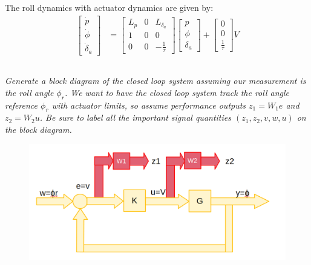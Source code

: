 \documentclass{article}
\begin{document}
The roll dynamics with actuator dynamics are given by:
\[
\begin{aligned}
\begin{bmatrix}
\dot{p} \\
\dot{\phi} \\
\dot{\delta}_a
\end{bmatrix}
&=
\begin{bmatrix}
L_p & 0 & L_{\delta_a} \\
1 & 0 & 0 \\
0 & 0 & -\frac{1}{\tau}
\end{bmatrix}
\begin{bmatrix}
p \\
\phi \\
\delta_a
\end{bmatrix}
+
\begin{bmatrix}
0 \\
0 \\
\frac{1}{\tau}
\end{bmatrix}
V
\end{aligned}
\]

\subsection{}

\textit{Generate a block diagram of the closed loop system assuming our measurement is the roll angle $\phi_r$. We want to have the closed loop system track the roll angle reference $\phi_r$ with actuator limits, so assume performance outputs $z_1 = W_1 e$ and $z_2 = W_2 u$. Be sure to label all the important signal quantities $(z_1, z_2, v, w, u)$ on the block diagram.}

\begin{figure}[H]
    \centering
    \includegraphics[width=\textwidth]{uasBlock.png}
\end{figure}

\subsection{}
\end{document}
